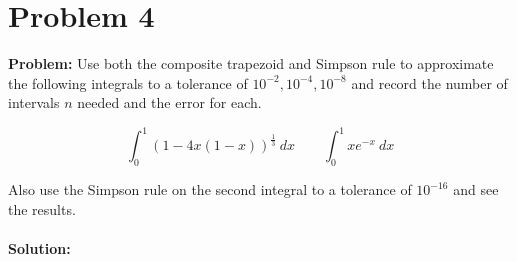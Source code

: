 \documentclass{article}
\begin{document}
\section*{Problem 4}
\textbf{Problem:} Use both the composite trapezoid and Simpson rule to approximate the following integrals to a tolerance of $10^{-2},10^{-4},10^{-8}$ and record the number of intervals $n$ needed and the error for each.

$$\int^1_0 (1-4x(1-x))^{\frac{1}{3}}\ dx\ \ \ \ \ \ \ \ \ \int^1_0 xe^{-x}\ dx$$

Also use the Simpson rule on the second integral to a tolerance of $10^{-16}$ and see the results.
\\\\
\textbf{Solution:}
\end{document}
